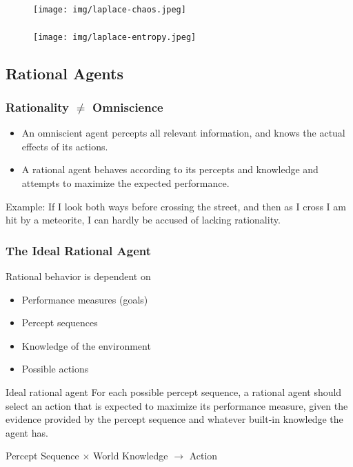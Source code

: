 \documentclass[UTF8,11pt,colorlinks,compress,openany]{beamer}%
\begin{document}
\begin{frame}\frametitle{}
\begin{figure}[H]
\texttt{[image: img/laplace-chaos.jpeg]}
\end{figure}
\end{frame}

\begin{frame}\frametitle{}
\begin{figure}[H]
\texttt{[image: img/laplace-entropy.jpeg]}
\end{figure}
\end{frame}

\subsection{Rational Agents}

\begin{frame}\frametitle{Rationality $\ne$ Omniscience}
\begin{itemize}
	\item An omniscient agent percepts all relevant information, and knows the actual effects of its actions.
	\item A rational agent behaves according to its percepts and knowledge and attempts to maximize the expected performance.
\end{itemize}
Example: If I look both ways before crossing the street, and then as I cross I am hit by a meteorite, I can hardly be accused of lacking rationality.
\end{frame}

\begin{frame}\frametitle{The Ideal Rational Agent}
Rational behavior is dependent on
\begin{itemize}
	\item Performance measures (goals)
	\item Percept sequences
	\item Knowledge of the environment
	\item Possible actions
\end{itemize}
\begin{block}{Ideal rational agent}
For each possible percept sequence, a rational agent should select an action that is expected to maximize its performance measure, given the evidence provided by the percept sequence and whatever built-in knowledge the agent has.	
\end{block}
\centerline{Percept Sequence $\times$ World Knowledge $\to$ Action}
\end{frame}
\end{document}
